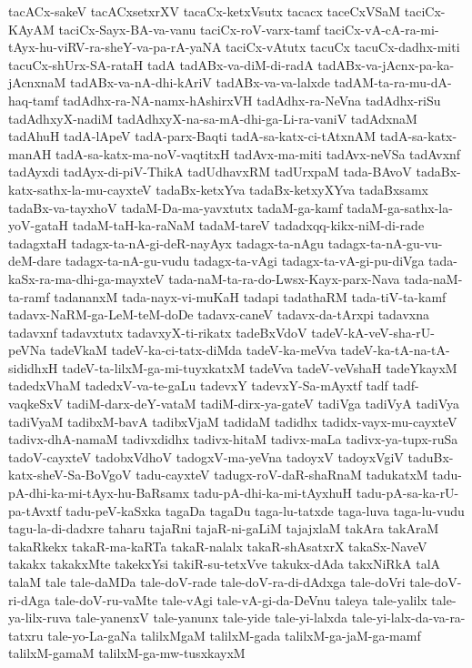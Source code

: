 {tacACx-sakeV
tacACxsetxrXV
tacaCx-ketxVsutx
tacacx
taceCxVSaM
taciCx-KAyAM
taciCx-Sayx-BA-va-vanu
taciCx-roV-varx-tamf
taciCx-vA-cA-ra-mi-tAyx-hu-viRV-ra-sheY-va-pa-rA-yaNA
taciCx-vAtutx
tacuCx
tacuCx-dadhx-miti
tacuCx-shUrx-SA-rataH
tadA
tadABx-va-diM-di-radA
tadABx-va-jAcnx-pa-ka-jAcnxnaM
tadABx-va-nA-dhi-kAriV
tadABx-va-va-lalxde
tadAM-ta-ra-mu-dA-haq-tamf
tadAdhx-ra-NA-namx-hAshirxVH
tadAdhx-ra-NeVna
tadAdhx-riSu
tadAdhxyX-nadiM
tadAdhxyX-na-sa-mA-dhi-ga-Li-ra-vaniV
tadAdxnaM
tadAhuH
tadA-lApeV
tadA-parx-Baqti
tadA-sa-katx-ci-tAtxnAM
tadA-sa-katx-manAH
tadA-sa-katx-ma-noV-vaqtitxH
tadAvx-ma-miti
tadAvx-neVSa
tadAvxnf
tadAyxdi
tadAyx-di-piV-ThikA
tadUdhavxRM
tadUrxpaM
tada-BAvoV
tadaBx-katx-sathx-la-mu-cayxteV
tadaBx-ketxYva
tadaBx-ketxyXYva
tadaBxsamx
tadaBx-va-tayxhoV
tadaM-Da-ma-yavxtutx
tadaM-ga-kamf
tadaM-ga-sathx-la-yoV-gataH
tadaM-taH-ka-raNaM
tadaM-tareV
tadadxqq-kikx-niM-di-rade
tadagxtaH
tadagx-ta-nA-gi-deR-nayAyx
tadagx-ta-nAgu
tadagx-ta-nA-gu-vu-deM-dare
tadagx-ta-nA-gu-vudu
tadagx-ta-vAgi
tadagx-ta-vA-gi-pu-diVga
tada-kaSx-ra-ma-dhi-ga-mayxteV
tada-naM-ta-ra-do-Lwsx-Kayx-parx-Nava
tada-naM-ta-ramf
tadananxM
tada-nayx-vi-muKaH
tadapi
tadathaRM
tada-tiV-ta-kamf
tadavx-NaRM-ga-LeM-teM-doDe
tadavx-caneV
tadavx-da-tArxpi
tadavxna
tadavxnf
tadavxtutx
tadavxyX-ti-rikatx
tadeBxVdoV
tadeV-kA-veV-sha-rU-peVNa
tadeVkaM
tadeV-ka-ci-tatx-diMda
tadeV-ka-meVva
tadeV-ka-tA-na-tA-sididhxH
tadeV-ta-lilxM-ga-mi-tuyxkatxM
tadeVva
tadeV-veVshaH
tadeYkayxM
tadedxVhaM
tadedxV-va-te-gaLu
tadevxY
tadevxY-Sa-mAyxtf
tadf
tadf-vaqkeSxV
tadiM-darx-deY-vataM
tadiM-dirx-ya-gateV
tadiVga
tadiVyA
tadiVya
tadiVyaM
tadibxM-bavA
tadibxVjaM
tadidaM
tadidhx
tadidx-vayx-mu-cayxteV
tadivx-dhA-namaM
tadivxdidhx
tadivx-hitaM
tadivx-maLa
tadivx-ya-tupx-ruSa
tadoV-cayxteV
tadobxVdhoV
tadogxV-ma-yeVna
tadoyxV
tadoyxVgiV
taduBx-katx-sheV-Sa-BoVgoV
tadu-cayxteV
tadugx-roV-daR-shaRnaM
tadukatxM
tadu-pA-dhi-ka-mi-tAyx-hu-BaRsamx
tadu-pA-dhi-ka-mi-tAyxhuH
tadu-pA-sa-ka-rU-pa-tAvxtf
tadu-peV-kaSxka
tagaDa
tagaDu
taga-lu-tatxde
taga-luva
taga-lu-vudu
tagu-la-di-dadxre
taharu
tajaRni
tajaR-ni-gaLiM
tajajxlaM
takAra
takAraM
takaRkekx
takaR-ma-kaRTa
takaR-nalalx
takaR-shAsatxrX
takaSx-NaveV
takakx
takakxMte
takekxYsi
takiR-su-tetxVve
takukx-dAda
takxNiRkA
talA
talaM
tale
tale-daMDa
tale-doV-rade
tale-doV-ra-di-dAdxga
tale-doVri
tale-doV-ri-dAga
tale-doV-ru-vaMte
tale-vAgi
tale-vA-gi-da-DeVnu
taleya
tale-yalilx
tale-ya-lilx-ruva
tale-yanenxV
tale-yanunx
tale-yide
tale-yi-lalxda
tale-yi-lalx-da-va-ra-tatxru
tale-yo-La-gaNa
talilxMgaM
talilxM-gada
talilxM-ga-jaM-ga-mamf
talilxM-gamaM
talilxM-ga-mw-tusxkayxM
}
